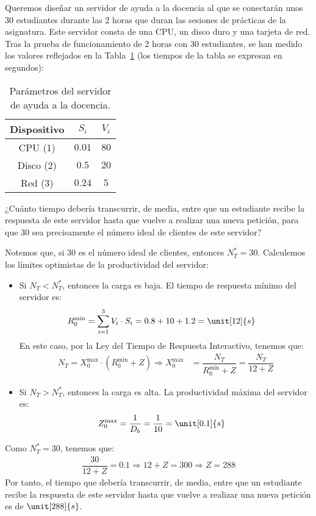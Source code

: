 \begin{ejercicio}\label{ej:5.33}
    Queremos diseñar un servidor de ayuda a la docencia al que se conectarán unos 30 estudiantes durante las 2 horas que duran las sesiones de prácticas de la asignatura. Este servidor consta de una CPU, un disco duro y una tarjeta de red. Tras la prueba de funcionamiento de 2 horas con 30 estudiantes, se han medido los valores reflejados en la Tabla~\ref{tab:5.33} (los tiempos de la tabla se expresan en segundos):
    \begin{table}[h]
        \centering
        \begin{tabular}{|c|c|c|}
            \hline
            Dispositivo & $S_i$ & $V_i$ \\
            \hline
            CPU (1) & $0.01$ & $80$ \\
            Disco (2) & $0.5$ & $20$ \\
            Red (3) & $0.24$ & $5$ \\
            \hline
        \end{tabular}
        \caption{Parámetros del servidor de ayuda a la docencia.}
        \label{tab:5.33}
    \end{table}
    ¿Cuánto tiempo debería transcurrir, de media, entre que un estudiante recibe la respuesta de este servidor hasta que vuelve a realizar una nueva petición, para que 30 sea precisamente el número ideal de clientes de este servidor?
    
    Notemos que, si $30$ es el número ideal de clientes, entonces $N_T^* = 30$. Calculemos los límites optimistas de la productividad del servidor:
    \begin{itemize}
        \item Si $N_T < N_T^*$, entonces la carga es baja. El tiempo de respuesta mínimo del servidor es:
        \begin{align*}
            R_0^{\min} &= \sum_{i=1}^{3} V_i \cdot S_i = 0.8+10+1.2 = \unit[12]{s}
        \end{align*}
        En este caso, por la Ley del Tiempo de Respuesta Interactivo, tenemos que:
        \begin{align*}
            N_T = X_0^{\max} \cdot (R_0^{\min} + Z)
            \Longrightarrow X_0^{\max} &= \dfrac{N_T}{R_0^{\min} + Z} = \dfrac{N_T}{12 + Z}
        \end{align*}
        \item Si $N_T> N_T^*$, entonces la carga es alta. La productividad máxima del servidor es:
        \begin{align*}
            Z_0^{\max} &= \frac{1}{D_b} = \frac{1}{10} = \unit[0.1]{s}
        \end{align*}
    \end{itemize}

    Como $N_T^* = 30$, tenemos que:
    \begin{align*}
        \dfrac{30}{12 + Z} = 0.1
        \Longrightarrow 12 + Z = 300
        \Longrightarrow Z = 288
    \end{align*}
    Por tanto, el tiempo que debería transcurrir, de media, entre que un estudiante recibe la respuesta de este servidor hasta que vuelve a realizar una nueva petición es de $\unit[288]{s}$.
\end{ejercicio}
